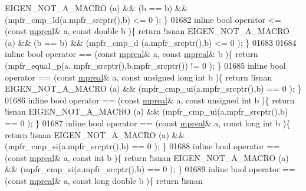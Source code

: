\begin{DoxyCode}
      EIGEN\_NOT\_A\_MACRO (a) && (b == b) && (mpfr\_cmp\_ld(a.mpfr\_srcptr(),b) <= 0 );   \}
01682 \textcolor{keyword}{inline} \textcolor{keywordtype}{bool} operator <= (\textcolor{keyword}{const} \hyperlink{classmpfr_1_1mpreal}{mpreal}& a, \textcolor{keyword}{const} \textcolor{keywordtype}{double} b            )\{  \textcolor{keywordflow}{return} !isnan 
      EIGEN\_NOT\_A\_MACRO (a) && (b == b) && (mpfr\_cmp\_d (a.mpfr\_srcptr(),b) <= 0 );   \}
01683 
01684 \textcolor{keyword}{inline} \textcolor{keywordtype}{bool} operator == (\textcolor{keyword}{const} \hyperlink{classmpfr_1_1mpreal}{mpreal}& a, \textcolor{keyword}{const} \hyperlink{classmpfr_1_1mpreal}{mpreal}& b           )\{  \textcolor{keywordflow}{return} (mpfr\_equal\_p(a.
      mpfr\_srcptr(),b.mpfr\_srcptr()) != 0 );              \}
01685 \textcolor{keyword}{inline} \textcolor{keywordtype}{bool} operator == (\textcolor{keyword}{const} \hyperlink{classmpfr_1_1mpreal}{mpreal}& a, \textcolor{keyword}{const} \textcolor{keywordtype}{unsigned} \textcolor{keywordtype}{long} \textcolor{keywordtype}{int} b )\{  \textcolor{keywordflow}{return} !isnan 
      EIGEN\_NOT\_A\_MACRO (a) && (mpfr\_cmp\_ui(a.mpfr\_srcptr(),b) == 0 );                \}
01686 \textcolor{keyword}{inline} \textcolor{keywordtype}{bool} operator == (\textcolor{keyword}{const} \hyperlink{classmpfr_1_1mpreal}{mpreal}& a, \textcolor{keyword}{const} \textcolor{keywordtype}{unsigned} \textcolor{keywordtype}{int} b      )\{  \textcolor{keywordflow}{return} !isnan 
      EIGEN\_NOT\_A\_MACRO (a) && (mpfr\_cmp\_ui(a.mpfr\_srcptr(),b) == 0 );                \}
01687 \textcolor{keyword}{inline} \textcolor{keywordtype}{bool} operator == (\textcolor{keyword}{const} \hyperlink{classmpfr_1_1mpreal}{mpreal}& a, \textcolor{keyword}{const} \textcolor{keywordtype}{long} \textcolor{keywordtype}{int} b          )\{  \textcolor{keywordflow}{return} !isnan 
      EIGEN\_NOT\_A\_MACRO (a) && (mpfr\_cmp\_si(a.mpfr\_srcptr(),b) == 0 );                \}
01688 \textcolor{keyword}{inline} \textcolor{keywordtype}{bool} operator == (\textcolor{keyword}{const} \hyperlink{classmpfr_1_1mpreal}{mpreal}& a, \textcolor{keyword}{const} \textcolor{keywordtype}{int} b               )\{  \textcolor{keywordflow}{return} !isnan 
      EIGEN\_NOT\_A\_MACRO (a) && (mpfr\_cmp\_si(a.mpfr\_srcptr(),b) == 0 );                \}
01689 \textcolor{keyword}{inline} \textcolor{keywordtype}{bool} operator == (\textcolor{keyword}{const} \hyperlink{classmpfr_1_1mpreal}{mpreal}& a, \textcolor{keyword}{const} \textcolor{keywordtype}{long} \textcolor{keywordtype}{double} b       )\{  \textcolor{keywordflow}{return} !isnan 

\end{DoxyCode}
